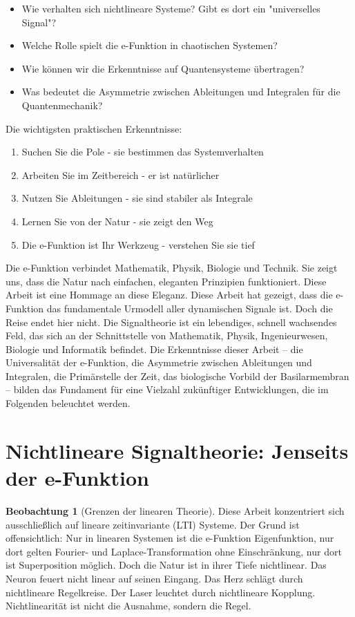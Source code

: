 ﻿\documentclass[a4paper,12pt]{report}
\theoremstyle{definition}
\newtheorem{beobachtung}{Beobachtung}
\begin{document}
	\begin{itemize}
		\item[-] Wie verhalten sich nichtlineare Systeme? Gibt es dort ein "universelles Signal"?
		\item[-] Welche Rolle spielt die e-Funktion in chaotischen Systemen?
		\item[-] Wie können wir die Erkenntnisse auf Quantensysteme übertragen?
		\item[-] Was bedeutet die Asymmetrie zwischen Ableitungen und Integralen für die Quantenmechanik?
	\end{itemize}
	Die wichtigsten praktischen Erkenntnisse:
		
	\begin{enumerate}
		\item[-] Suchen Sie die Pole - sie bestimmen das Systemverhalten
		\item[-] Arbeiten Sie im Zeitbereich - er ist natürlicher
		\item[-] Nutzen Sie Ableitungen - sie sind stabiler als Integrale
		\item[-] Lernen Sie von der Natur - sie zeigt den Weg
		\item[-] Die e-Funktion ist Ihr Werkzeug - verstehen Sie sie tief
	\end{enumerate}
	
	Die e-Funktion verbindet Mathematik, Physik, Biologie und Technik. Sie zeigt uns, dass die Natur nach einfachen, eleganten Prinzipien funktioniert. Diese Arbeit ist eine Hommage an diese Eleganz.	
	Diese Arbeit hat gezeigt, dass die e-Funktion das fundamentale Urmodell aller dynamischen Signa\-le ist. Doch die Reise endet hier nicht. Die Signaltheorie ist ein lebendiges, schnell wachsendes Feld, das sich an der Schnittstelle von Mathematik, Physik, Ingenieurwesen, Biologie und Informatik befindet. Die Erkenntnisse dieser Arbeit -- die Universalität der e-Funktion, die Asymmetrie zwischen Ableitungen und Integralen, die Primärstelle der Zeit, das biologische Vorbild der Basilarmembran -- bilden das Fundament für eine Vielzahl zukünftiger Entwicklungen, die im Folgenden beleuchtet werden.
	
	\section{Nichtlineare Signaltheorie: Jenseits der e-Funktion}
	
	\begin{beobachtung}[Grenzen der linearen Theorie]
		Diese Arbeit konzentriert sich ausschließlich auf lineare zeitinvariante (LTI) Systeme. Der Grund ist offensichtlich: Nur in linearen Systemen ist die e-Funktion Eigenfunktion, nur dort gelten Fourier- und Laplace-Transformation ohne Einschränkung, nur dort ist Superposition möglich. Doch die Natur ist in ihrer Tiefe nichtlinear. Das Neuron feuert nicht linear auf seinen Eingang. Das Herz schlägt durch nichtlineare Regelkreise. Der Laser leuchtet durch nichtlineare Kopplung. Nichtlinearität ist nicht die Ausnahme, sondern die Regel.
	\end{beobachtung}
	
\end{document}
